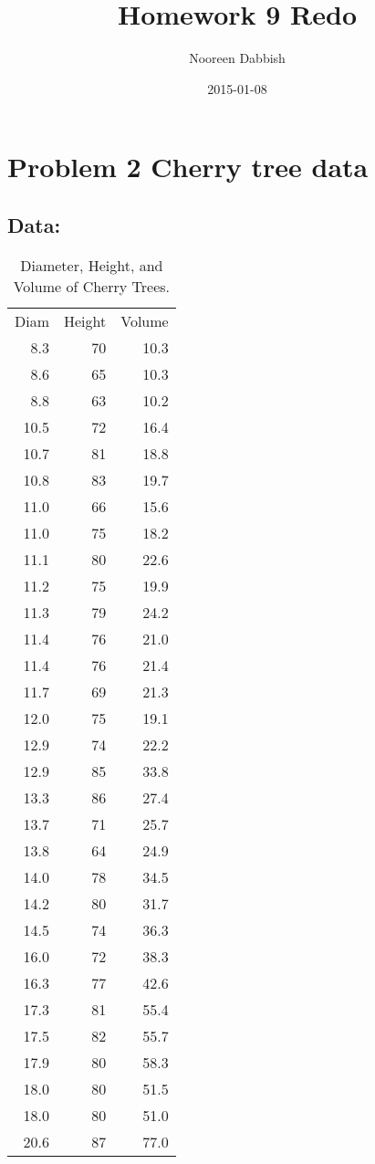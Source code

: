\documentclass[11pt]{article}
\title{Homework 9 Redo}
\author{Nooreen Dabbish}
\date{2015-01-08}
\begin{document}
\maketitle


\section{Problem 2 Cherry tree data}
\label{sec-1}
\subsection{Data:}
\label{sec-1-1}


\begin{table}[htb]
\caption{Diameter, Height, and Volume of Cherry Trees.} 
\begin{center}
\begin{tabular}{rrr}
 Diam  &  Height  &  Volume  \\
  8.3  &      70  &    10.3  \\
  8.6  &      65  &    10.3  \\
  8.8  &      63  &    10.2  \\
 10.5  &      72  &    16.4  \\
 10.7  &      81  &    18.8  \\
 10.8  &      83  &    19.7  \\
 11.0  &      66  &    15.6  \\
 11.0  &      75  &    18.2  \\
 11.1  &      80  &    22.6  \\
 11.2  &      75  &    19.9  \\
 11.3  &      79  &    24.2  \\
 11.4  &      76  &    21.0  \\
 11.4  &      76  &    21.4  \\
 11.7  &      69  &    21.3  \\
 12.0  &      75  &    19.1  \\
 12.9  &      74  &    22.2  \\
 12.9  &      85  &    33.8  \\
 13.3  &      86  &    27.4  \\
 13.7  &      71  &    25.7  \\
 13.8  &      64  &    24.9  \\
 14.0  &      78  &    34.5  \\
 14.2  &      80  &    31.7  \\
 14.5  &      74  &    36.3  \\
 16.0  &      72  &    38.3  \\
 16.3  &      77  &    42.6  \\
 17.3  &      81  &    55.4  \\
 17.5  &      82  &    55.7  \\
 17.9  &      80  &    58.3  \\
 18.0  &      80  &    51.5  \\
 18.0  &      80  &    51.0  \\
 20.6  &      87  &    77.0  \\
\end{tabular}
\end{center}
\end{table}
\end{document}
